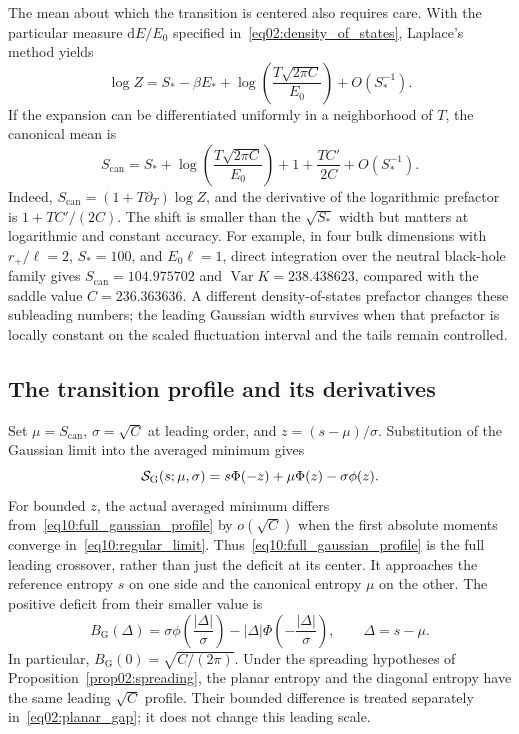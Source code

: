 \documentclass[11pt,letterpaper]{article}
\DeclareMathOperator{\Var}{Var}
\newcommand{\dd}{\mathrm{d}}
\theoremstyle{plain}
\theoremstyle{definition}
\theoremstyle{remark}
\begin{document}
The mean about which the transition is centered also requires care. With the particular measure $\dd E/E_0$ specified in~\eqref{eq02:density_of_states}, Laplace's method yields
\begin{equation}
 \log Z=S_*-\beta E_*
 +\log\!\left(\frac{T\sqrt{2\pi C}}{E_0}\right)+O(S_*^{-1}).
 \label{eq10:partition_saddle}
\end{equation}
If the expansion can be differentiated uniformly in a neighborhood of $T$, the canonical mean is
\begin{equation}
 S_{\mathrm{can}}
 =S_*+\log\!\left(\frac{T\sqrt{2\pi C}}{E_0}\right)
 +1+\frac{TC'}{2C}+O(S_*^{-1}).
 \label{eq10:canonical_center}
\end{equation}
Indeed, $S_{\mathrm{can}}=(1+T\partial_T)\log Z$, and the derivative of the logarithmic prefactor is $1+TC'/(2C)$. The shift is smaller than the $\sqrt{S_*}$ width but matters at logarithmic and constant accuracy. For example, in four bulk dimensions with $r_+/\ell=2$, $S_*=100$, and $E_0\ell=1$, direct integration over the neutral black-hole family gives $S_{\mathrm{can}}=104.975702$ and $\Var K=238.438623$, compared with the saddle value $C=236.363636$. A different density-of-states prefactor changes these subleading numbers; the leading Gaussian width survives when that prefactor is locally constant on the scaled fluctuation interval and the tails remain controlled.

\subsection{The transition profile and its derivatives}

Set $\mu=S_{\mathrm{can}}$, $\sigma=\sqrt C$ at leading order, and $z=(s-\mu)/\sigma$. Substitution of the Gaussian limit into the averaged minimum gives
\begin{equation}
 {\cal S}_{\mathrm G}(s;\mu,\sigma)
 =s\Phi(-z)+\mu\Phi(z)-\sigma\phi(z).
 \label{eq10:full_gaussian_profile}
\end{equation}
For bounded $z$, the actual averaged minimum differs from~\eqref{eq10:full_gaussian_profile} by $o(\sqrt C)$ when the first absolute moments converge in~\eqref{eq10:regular_limit}. Thus~\eqref{eq10:full_gaussian_profile} is the full leading crossover, rather than just the deficit at its center. It approaches the reference entropy $s$ on one side and the canonical entropy $\mu$ on the other. The positive deficit from their smaller value is
\begin{equation}
 B_{\mathrm G}(\Delta)
 =\sigma\phi\!\left(\frac{|\Delta|}{\sigma}\right)
 -|\Delta|\Phi\!\left(-\frac{|\Delta|}{\sigma}\right),
 \qquad \Delta=s-\mu.
 \label{eq10:gaussian_deficit}
\end{equation}
In particular, $B_{\mathrm G}(0)=\sqrt{C/(2\pi)}$. Under the spreading hypotheses of Proposition~\ref{prop02:spreading}, the planar entropy and the diagonal entropy have the same leading $\sqrt C$ profile. Their bounded difference is treated separately in~\eqref{eq02:planar_gap}; it does not change this leading scale.
\end{document}
